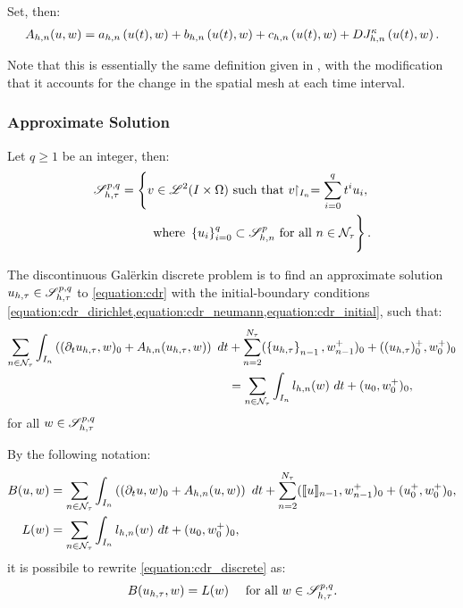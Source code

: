 Set, then:
\begin{align}
    A_{h, n}(u, w) = a_{h, n} \left( u(t), w \right) + b_{h, n} \left( u(t), w \right) + c_{h, n} \left( u(t), w \right) + D J^{\kappa}_{h, n} \left( u(t), w \right) \label{equation:cdr_Ahn}.
\end{align}

Note that this is essentially the same definition given in , with the modification that it accounts for the change in the spatial mesh at each time interval.

\newpage
\subsubsection{Approximate Solution}

\begin{definition}[$\SpaceSolutionFull$]
    Let $q \geq 1$ be an integer, then:
    \begin{align} %
        \SpaceSolutionFull = \left\{ v \in \SpaceLp{2}(I \times \Omega) \text{ such that } v \Restriction_{I_n} = \sum_{i = 0}^q t^i u_i, \right. \\ 
        \left. \vphantom{\sum_{i = 0}^q} \text{ where } \left\{ u_i \right\}_{i = 0}^q \subset \SpaceSolution_{h, n}^p \text{ for all } n \in \TimeIndices \right\}.
    \end{align}
\end{definition}

The discontinuous Galërkin discrete problem is to find an approximate solution $u_{h, \tau} \in \mathscr{S}^{p, q}_{h, \tau}$ to \cref{equation:cdr} with the initial-boundary conditions \cref{equation:cdr_dirichlet,equation:cdr_neumann,equation:cdr_initial}, such that:
\begin{align} %
    \sum_{n \in \TimeIndices} \int_{I_n} \left( (\partial_t u_{h, \tau}, w )_0 + A_{h, n}(u_{h, \tau}, w) \right) ~ dt \notag &+ \sum_{n = 2}^{\nTimeIndices} (\left\{ u_{h, \tau} \right\}_{n - 1}, w_{n - 1}^+ )_0 + ((u_{h, \tau})_0^+, w_0^+ )_0 \notag \\
    &= \sum_{n \in \TimeIndices} \int_{I_n} l_{h, n}(w) ~ dt + (u_0, w_0^+ )_0, \label{equation:cdr_discrete}
\end{align}
for all $w \in \mathscr{S}^{p, q}_{h, \tau}$

By the following notation:
\begin{align}
    B(u, w) &= \sum_{n \in \mathcal{N}_{\tau}} \int_{I_n} \left( (\partial_t u, w )_0 + A_{h, n}(u, w) \right) ~ dt + \sum_{n = 2}^{N_{\tau}} (\llbracket u \rrbracket_{n - 1}, w_{n - 1}^+ )_0 + (u_0^+, w_0^+ )_0, \label{equation:cdr_B} \\
    L(w) &= \sum_{n \in \mathcal{N}_{\tau}} \int_{I_n} l_{h, n}(w) ~ dt + (u_0, w_0^+ )_0 \label{equation:cdr_L},
\end{align}
it is possibile to rewrite \cref{equation:cdr_discrete} as:
\begin{align}
    B(u_{h, \tau}, w) &= L(w) &\text{ for all } w \in \mathscr{S}^{p, q}_{h, \tau}. \label{equation:cdr_discrete_short}
\end{align}

